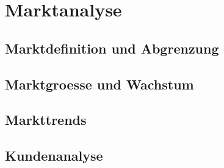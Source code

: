 \chapter{Marktanalyse}\label{chap:markt}

\section{Marktdefinition und Abgrenzung}\label{sec:abgrenzung}

\section{Marktgroesse und Wachstum}\label{sec:groesse}

\section{Markttrends}\label{sec:trends}

\section{Kundenanalyse}\label{sec:kunden}
